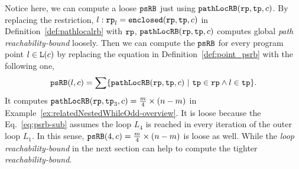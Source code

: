   Notice here, we can compute a loose $\mathtt{psRB}$ just using $\mathtt{pathLocRB}(\mathtt{rp}, \mathtt{tp}, c)$. By replacing the restriction, $l: \mathtt{rp}_l = \mathtt{enclosed}(\mathtt{rp}, \mathtt{tp}, c)$ in Definition~\ref{def:pathlocalrb} with $\mathtt{rp}$, $\mathtt{pathLocRB}(\mathtt{rp}, \mathtt{tp}, c)$ computes global \emph{path reachability-bound} loosely.
Then we can compute the $\mathtt{psRB}$ for every program point $l \in \mathtt{L}(c)$ by replacing the equation in Definition~\ref{def:point_psrb} with the following one,
\begin{equation}
  \label{eq:psrb-sub}
  \psRB(l, c) = 
  \sum
  \left\{ \outinB(\rprog, \tpath, c) ~\vert~ \tpath \in \rprog \land 
  l \in \tpath \right\}.
\end{equation}
It computes
$\mathtt{pathLocRB}(\mathtt{rp}, \mathtt{tp}_3, c) = \frac{m}{4} \times (n - m)$ in Example~\ref{ex:relatedNestedWhileOdd-overview}.
It is loose because the Eq.~\ref{eq:psrb-sub} assumes the loop $L_4$ is reached in every iteration of the outer loop $L_1$. In this sense, $\mathtt{psRB}(4, c) = \frac{m}{4} \times (n - m)$ is loose as well.
While the \emph{loop reachability-bound} in the next section can help to compute the tighter \emph{reachability-bound}.
